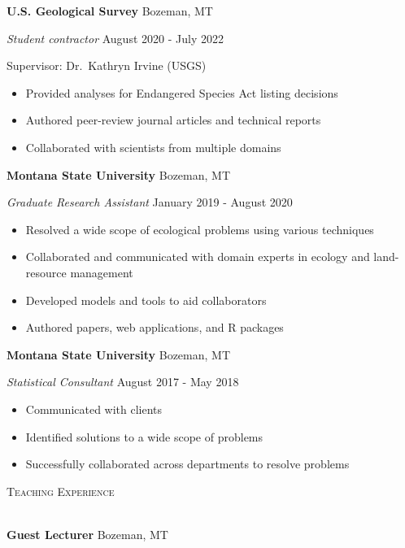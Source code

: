 \documentclass[a4paper]{article}
\newcommand{\lineunder} {
	\vspace*{-8pt} \\
	\hspace*{-18pt} \hrulefill \\
}
\newcommand{\header} [1] {
	{\hspace*{-18pt}\vspace*{6pt} \textsc{#1}}
	\vspace*{-6pt} \lineunder
}
\begin{document}
\textbf{U.S. Geological Survey} \hfill Bozeman, MT

\textit{Student contractor} \hfill August 2020 - July 2022

Supervisor: Dr.~Kathryn Irvine (USGS)

\vspace{-1mm}
\begin{itemize} \itemsep 1pt
   \item Provided analyses for Endangered Species Act listing decisions
   \item Authored peer-review journal articles and technical reports
   \item Collaborated with scientists from multiple domains 
\end{itemize}

\textbf{Montana State University} \hfill Bozeman, MT

\textit{Graduate Research Assistant} \hfill January 2019 - August 2020

\vspace{-1mm}
\begin{itemize} \itemsep 1pt
   \item Resolved a wide scope of ecological problems using various techniques
   \item Collaborated and communicated with domain experts in ecology and land-resource management
   \item Developed models and tools to aid collaborators
   \item Authored papers, web applications, and R packages
\end{itemize}

\textbf{Montana State University} \hfill Bozeman, MT

\textit{Statistical Consultant} \hfill August 2017 - May 2018

\vspace{-1mm}
\begin{itemize} \itemsep 1pt
   \item Communicated with clients
   \item Identified solutions to a wide scope of problems
   \item Successfully collaborated across departments to resolve problems
\end{itemize}

\newpage

\header{Teaching Experience}
\vspace*{2mm}

\textbf{Guest Lecturer} \hfill Bozeman, MT
\end{document}
